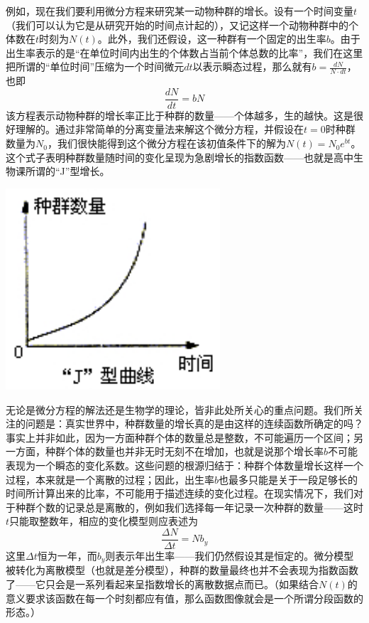 \documentclass[12pt,a4paper]{article}
\begin{document}
{{			例如，现在我们要利用微分方程来研究某一动物种群的增长。设有一个时间变量$t$（我们可以认为它是从研究开始的时间点计起的），又记这样一个动物种群中的个体数在$t$时刻为$N(t)$。此外，我们还假设，这一种群有一个固定的出生率$b$。由于出生率表示的是“在单位时间内出生的个体数占当前个体总数的比率”，我们在这里把所谓的“单位时间”压缩为一个时间微元$dt$以表示瞬态过程，那么就有$b=\frac{dN}{N\cdot dt}$，也即
			\[
				\frac{dN}{dt}=bN
			\]
			该方程表示动物种群的增长率正比于种群的数量——个体越多，生的越快。这是很好理解的。通过非常简单的分离变量法来解这个微分方程，并假设在$t=0$时种群数量为$N_0$，我们很快能得到这个微分方程在该初值条件下的解为$N(t)=N_0e^{bt}$。这个式子表明种群数量随时间的变化呈现为急剧增长的指数函数——也就是高中生物课所谓的“J”型增长。
			\begin{center}
				\includegraphics[width=8cm]{J.jpg}
			\end{center}
			
			无论是微分方程的解法还是生物学的理论，皆非此处所关心的重点问题。我们所关注的问题是：真实世界中，种群数量的增长真的是由这样的连续函数所确定的吗？事实上并非如此，因为一方面种群个体的数量总是整数，不可能遍历一个区间；另一方面，种群个体的数量也并非无时无刻不在增加，也就是说那个增长率$b$不可能表现为一个瞬态的变化系数。这些问题的根源归结于：种群个体数量增长这样一个过程，本来就是一个离散的过程；因此，出生率$b$也最多只能是关于一段足够长的时间所计算出来的比率，不可能用于描述连续的变化过程。在现实情况下，我们对于种群个数的记录总是离散的，例如我们选择每一年记录一次种群的数量——这时$t$只能取整数年，相应的变化模型则应表述为
			\[
				\frac{\Delta N}{\Delta t}=Nb_y
			\]
			这里$\Delta t$恒为一年，而$b_y$则表示年出生率——我们仍然假设其是恒定的。微分模型被转化为离散模型（也就是差分模型），种群的数量最终也并不会表现为指数函数了——它只会是一系列看起来呈指数增长的离散数据点而已。（如果结合$N(t)$的意义要求该函数在每一个时刻都应有值，那么函数图像就会是一个所谓分段函数的形态。）
			
}}
\end{document}
